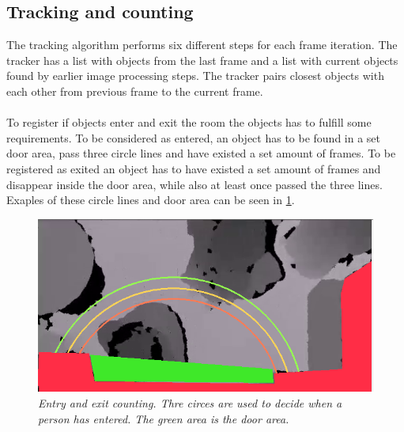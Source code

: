 \subsection{Tracking and counting}
The tracking algorithm performs six different steps for each frame iteration. The tracker has a list with objects from the last frame and a list with current objects found by earlier image processing steps. The tracker pairs closest objects with each other from previous frame to the current frame. 
\\ \\
To register if objects enter and exit the room the objects has to fulfill some requirements. To be considered as entered, an object has to be found in a set door area, pass three circle lines and have existed a set amount of frames. To be registered as exited an object has to have existed a set amount of frames and disappear inside the door area, while also at least once passed the three lines. Exaples of these circle lines and door area can be seen in \ref{fig:entry_exit}.

\begin{figure}[htb]
	\centering
	\includegraphics[width=0.8\linewidth]{images/entry_exit_circles.png}
	\caption[Entry exit circles]{\textit{Entry and exit counting. Thre circes are used to decide when a person has entered. The green area is the door area.}}
	\label{fig:entry_exit}  %
\end{figure}


